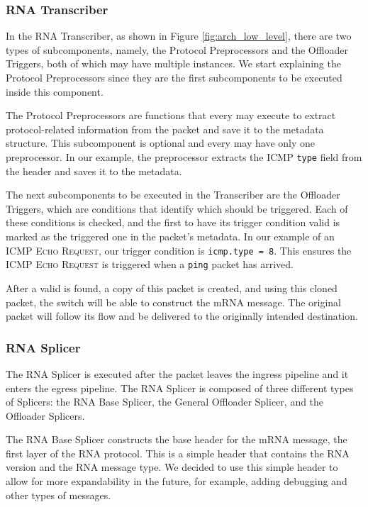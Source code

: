 \subsubsection*{RNA Transcriber}

In the RNA Transcriber, as shown in Figure \ref{fig:arch_low_level}, there are two types of subcomponents, namely, the Protocol Preprocessors and the Offloader Triggers, both of which may have multiple instances. We start explaining the Protocol Preprocessors since they are the first subcomponents to be executed inside this component.

The Protocol Preprocessors are functions that every \ProtocolTemplate{} may execute to extract protocol-related information from the packet and save it to the metadata structure. This subcomponent is optional and every \ProtocolTemplate{} may have only one preprocessor. In our example, the preprocessor extracts the ICMP \texttt{type} field from the header and saves it to the metadata.

The next subcomponents to be executed in the Transcriber are the Offloader Triggers, which are conditions that identify which \Offloader{} should be triggered. Each of these conditions is checked, and the first \Offloader{} to have its trigger condition valid is marked as the triggered one in the packet's metadata. In our example of an ICMP \textsc{Echo Request}, our trigger condition is \texttt{icmp.type = 8}. This ensures the \Offloader{} \textsc{ICMP Echo Request} is triggered when a \texttt{ping} packet has arrived.


After a valid \Offloader{} is found, a copy of this packet is created, and using this cloned packet, the switch will be able to construct the mRNA message. The original packet will follow its flow and be delivered to the originally intended destination.

\subsubsection*{RNA Splicer}

The RNA Splicer is executed after the packet leaves the ingress pipeline and it enters the egress pipeline\footnotemark{}. The RNA Splicer is composed of three different types of Splicers: the RNA Base Splicer, the General Offloader Splicer, and the Offloader Splicers.

The RNA Base Splicer constructs the base header for the mRNA message, the first layer of the RNA protocol. This is a simple header that contains the RNA version and the RNA message type. We decided to use this simple header to allow for more expandability in the future, for example, adding debugging and other types of messages.


